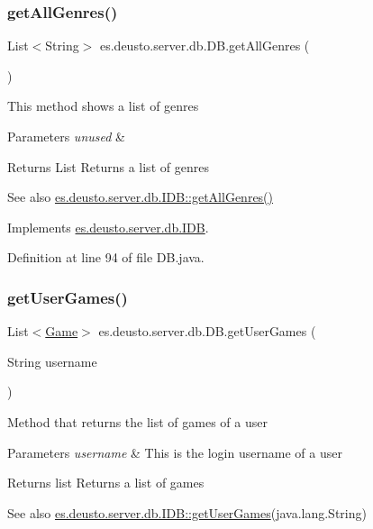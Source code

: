 \subsubsection{\texorpdfstring{get\+All\+Genres()}{getAllGenres()}}
{\footnotesize\ttfamily List$<$String$>$ es.\+deusto.\+server.\+db.\+D\+B.\+get\+All\+Genres (\begin{DoxyParamCaption}{ }\end{DoxyParamCaption})}

This method shows a list of genres 
\begin{DoxyParams}{Parameters}
{\em unused} & \\
\hline
\end{DoxyParams}
\begin{DoxyReturn}{Returns}
List Returns a list of genres 
\end{DoxyReturn}
\begin{DoxySeeAlso}{See also}
\hyperlink{interfacees_1_1deusto_1_1server_1_1db_1_1_i_d_b_ab0d82284b373b0ea3e0c441892e678b5}{es.\+deusto.\+server.\+db.\+I\+D\+B\+::get\+All\+Genres()} 
\end{DoxySeeAlso}


Implements \hyperlink{interfacees_1_1deusto_1_1server_1_1db_1_1_i_d_b_ab0d82284b373b0ea3e0c441892e678b5}{es.\+deusto.\+server.\+db.\+I\+DB}.



Definition at line 94 of file D\+B.\+java.

\mbox{\label{classes_1_1deusto_1_1server_1_1db_1_1_d_b_a1c471589284782e7ff1190f2b6c2369e}} 
\subsubsection{\texorpdfstring{get\+User\+Games()}{getUserGames()}}
{\footnotesize\ttfamily List$<$\hyperlink{classes_1_1deusto_1_1server_1_1db_1_1data_1_1_game}{Game}$>$ es.\+deusto.\+server.\+db.\+D\+B.\+get\+User\+Games (\begin{DoxyParamCaption}\item[{String}]{username }\end{DoxyParamCaption})}

Method that returns the list of games of a user 
\begin{DoxyParams}{Parameters}
{\em username} & This is the login username of a user \\
\hline
\end{DoxyParams}
\begin{DoxyReturn}{Returns}
list Returns a list of games 
\end{DoxyReturn}
\begin{DoxySeeAlso}{See also}
\hyperlink{interfacees_1_1deusto_1_1server_1_1db_1_1_i_d_b_ac5ef9780a640140576f9373f8b57631c}{es.\+deusto.\+server.\+db.\+I\+D\+B\+::get\+User\+Games}(java.\+lang.\+String) 
\end{DoxySeeAlso}


